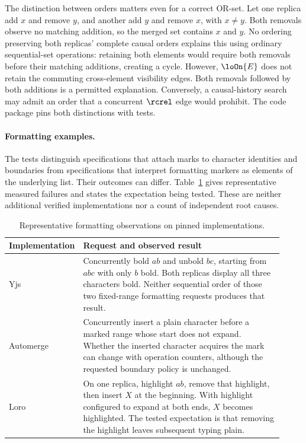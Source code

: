 The distinction between orders matters even for a correct OR-set. Let one
replica add $x$ and remove $y$, and another add $y$ and remove $x$, with
$x\ne y$. Both removals observe no matching addition, so the merged set
contains $x$ and $y$. No ordering preserving both replicas' complete causal
orders explains this using ordinary sequential-set operations: retaining
both elements would require both removals before their matching additions,
creating a cycle. However, $\loOn{E}$ does not retain the commuting
cross-element visibility edges. Both removals followed by both additions is
a permitted explanation. Conversely, a causal-history search may admit an
order that a concurrent $\rcrel$ edge would prohibit. The code package pins
both distinctions with tests.

\paragraph{Formatting examples.}
The tests distinguish specifications that attach marks to character
identities and boundaries from specifications that interpret formatting
markers as elements of the underlying list. Their outcomes can differ.
Table~\ref{tab:external-formatting} gives representative measured failures
and states the expectation being tested. These are neither additional
verified implementations nor a count of independent root causes.

\begin{table}[t]
\centering
\small
\caption{Representative formatting observations on pinned implementations.}
\label{tab:external-formatting}
\begin{tabular}{p{0.16\linewidth}p{0.76\linewidth}}
\hline
Implementation & Request and observed result \\
\hline
Yjs & Concurrently bold $ab$ and unbold $bc$, starting from $abc$ with only
$b$ bold. Both replicas display all three characters bold. Neither sequential order of those
two fixed-range formatting requests produces that result. \\[3pt]
Automerge & Concurrently insert a plain character before a marked range
whose start does not expand. Whether the inserted character acquires the
mark can change with operation counters, although the requested boundary
policy is unchanged. \\[3pt]
Loro & On one replica, highlight $ab$, remove that highlight, then insert
$X$ at the beginning. With highlight configured to expand at both ends,
$X$ becomes highlighted. The tested expectation is that removing the
highlight leaves subsequent typing plain. \\
\hline
\end{tabular}
\end{table}


